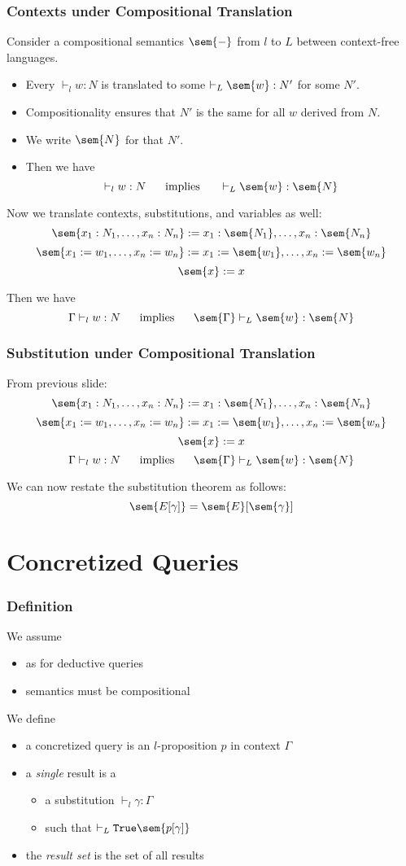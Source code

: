 \begin{frame}\frametitle{Contexts under Compositional Translation}
Consider a compositional semantics $\sem{-}$ from $l$ to $L$ between context-free languages.

\begin{itemize}
 \item Every $\vdash_l w:N$ is translated to some $\vdash_L \sem{w}:N'$ for some $N'$.
 \item Compositionality ensures that $N'$ is the same for all $w$ derived from $N$.
 \item We write $\sem{N}$ for that $N'$.
 \item Then we have 
  \[\vdash_l w:N \tb\mimplies\tb \vdash_L \sem{w}:\sem{N}\]
\end{itemize}

Now we translate contexts, substitutions, and variables as well:
\[\sem{x_1:N_1,\ldots,x_n:N_n}:=x_1:\sem{N_1},\ldots,x_n:\sem{N_n}\]
\[\sem{x_1:=w_1,\ldots,x_n:=w_n}:=x_1:=\sem{w_1},\ldots,x_n:=\sem{w_n}\]
\[\sem{x}:=x\]

Then we have
  \[\Gamma\vdash_l w:N \tb\mimplies\tb \sem{\Gamma}\vdash_L \sem{w}:\sem{N}\]
\end{frame}

\begin{frame}\frametitle{Substitution under Compositional Translation}
From previous slide:
\[\sem{x_1:N_1,\ldots,x_n:N_n}:=x_1:\sem{N_1},\ldots,x_n:\sem{N_n}\]
\[\sem{x_1:=w_1,\ldots,x_n:=w_n}:=x_1:=\sem{w_1},\ldots,x_n:=\sem{w_n}\]
\[\sem{x}:=x\]
\[\Gamma\vdash_l w:N \tb\mimplies\tb \sem{\Gamma}\vdash_L \sem{w}:\sem{N}\]

We can now restate the substitution theorem as follows:
  \[\sem{E[\gamma]}=\sem{E}[\sem{\gamma}]\]
\end{frame}

\section{Concretized Queries}

\begin{frame}\frametitle{Definition}
We assume
\begin{itemize}
\item as for deductive queries
\item semantics must be compositional
\end{itemize}

We define
\begin{itemize}
\item a concretized query is an $l$-proposition $p$ in context $\Gamma$
\item a \emph{single} result is a
 \begin{itemize}
 \item a substitution $\vdash_l \gamma:\Gamma$
 \item such that $\vdash_L \truelift \sem{p[\gamma]}$
 \end{itemize}
\item the \emph{result set} is the set of all results
\end{itemize}
\end{frame}

